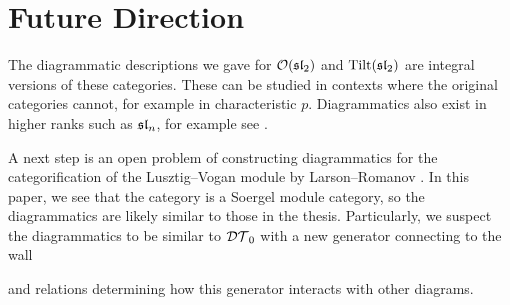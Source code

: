 \chapter{Future Direction}
\label{chapter:future-direction}

The diagrammatic descriptions we gave for $\mathcal{O}(\operatorname{\mathfrak{sl}}_2)$ and $\operatorname{Tilt}(\operatorname{\mathfrak{sl}}_2)$ are integral versions of these categories. These can be studied in contexts where the original categories cannot, for example in characteristic $p$. Diagrammatics also exist in higher ranks such as $\operatorname{\mathfrak{sl}}_n$, for example see \cite{riche-williamson-tilt-modules-p-canon-basis}.

A next step is an open problem of constructing diagrammatics for the categorification of the Lusztig--Vogan module by Larson--Romanov \cite{categorification-lusztig-vogan-module}. In this paper, we see that the category is a Soergel module category, so the diagrammatics are likely similar to those in the thesis. Particularly, we suspect the diagrammatics to be similar to $\mathcal{DT}_0$ with a new generator connecting to the wall
\begin{center}
\end{center}
and relations determining how this generator interacts with other diagrams.

